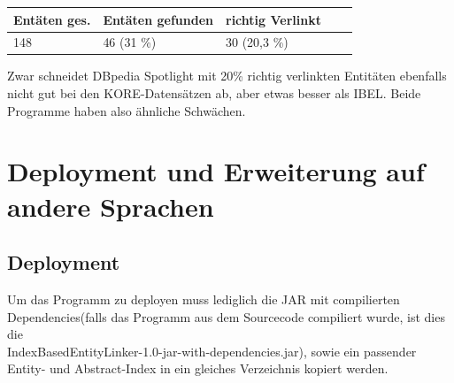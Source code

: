 \documentclass[11pt, a4paper, oneside]{Thesis} %
\begin{document}
\begin{center}
\begin{tabular}{|l|l|l|l|l|}
\hline
Ent\"aten ges. & Ent\"aten gefunden & richtig Verlinkt  \\
\hline
148 & 46 (31 \%) & 30 (20,3 \%) \\
\hline
\end{tabular}
\end{center}

Zwar schneidet DBpedia Spotlight mit 20\% richtig verlinkten Entit\"aten ebenfalls nicht gut bei den KORE-Datens\"atzen ab, aber etwas besser als IBEL.
Beide Programme haben also \"ahnliche Schw\"achen.


\chapter{Deployment und Erweiterung auf andere Sprachen}
\label{Kapitel 5} %

\section{Deployment}
Um das Programm zu deployen muss lediglich die JAR mit compilierten Dependencies(falls das Programm aus dem Sourcecode compiliert wurde, ist dies die \\\grqq IndexBasedEntityLinker-1.0-jar-with-dependencies.jar\grqq), sowie ein passender Entity- und Abstract-Index in ein gleiches Verzeichnis kopiert werden.
\end{document}
